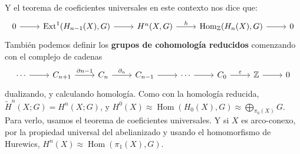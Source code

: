 \documentclass[spanish]{book}
\theoremstyle{definition}
\newcommand{\Z}{\mathbb{Z}}
\DeclareMathOperator{\Hom}{Hom}
\DeclareMathOperator{\Ext}{Ext}
\begin{document}
Y el teorema de coeficientes universales en este contexto nos dice que:
\[\begin{tikzcd}
	0\arrow[r]&\Ext^1(H_{n-1}(X),G)\arrow[r]&H^n(X,G)\arrow[r,"h"]&\Hom_\Z(H_n(X),G)\arrow[r]&0
\end{tikzcd}\]
También podemos definir los \textbf{grupos de cohomología reducidos} comenzando con el complejo de cadenas
\[\begin{tikzcd}
	\cdots\arrow[r]&C_{n+1}\arrow[r,"\partial{n-1}"]&C_n\arrow[r,"\partial_n"]&C_{n-1}\arrow[r]&\cdots\arrow[r]&C_0\arrow[r,"\varepsilon"]&\Z\arrow[r]&0
\end{tikzcd}\]
dualizando, y calculando homología. Como con la homología reducida, $\tilde{H}^n(X;G)=H^n(X;G)$, y $H^0(X)\approx\Hom(H_0(X),G)\approx\bigoplus_{\pi_0(X)}G$. Para verlo, usamos el teorema de coeficientes universales. Y si $X$ es arco-conexo, por la propiedad universal del abelianizado y usando el homomorfismo de Hurewics, $H^n(X)\approx\Hom(\pi_1(X),G)$.
\end{document}
